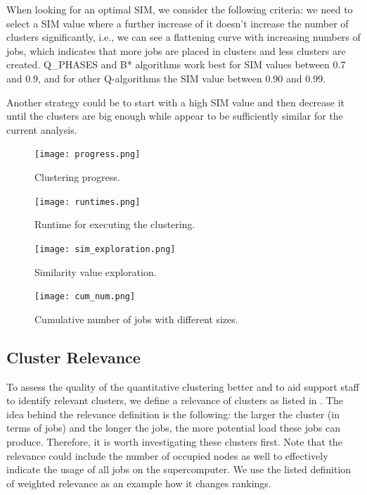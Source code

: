\documentclass{jhps}
\begin{document}
When looking for an optimal SIM, we consider the following criteria:
we need to select a SIM value where a further increase of it doesn't increase the number of clusters significantly, i.e., we can see a flattening curve with increasing numbers of jobs, which indicates that more jobs are placed in clusters and less clusters are created.
Q\_PHASES and B* algorithms work best for SIM values between 0.7 and 0.9, and for other Q-algorithms the SIM value between 0.90 and 0.99.

Another strategy could be to start with a high SIM value and then decrease it until the clusters are big enough while appear to be sufficiently similar for the current analysis.

\begin{figure}
  \centering
   \texttt{[image: progress.png]}
   \caption{Clustering progress.}
   \label{fig:clustering_progress}
\end{figure}

\begin{figure}
  \centering
  \texttt{[image: runtimes.png]}
  \caption{Runtime for executing the clustering.}
  \label{fig:alg_runtimes}
\end{figure}


\begin{figure}
  \centering
  \texttt{[image: sim\_exploration.png]}
  \caption{Similarity value exploration.}
  \label{fig:sim_exploration}
\end{figure}

\begin{figure}
  \centering
  \texttt{[image: cum\_num.png]}
  \caption{Cumulative number of jobs with different sizes.}
  \label{fig:cum_num_job_sizes}
\end{figure}

\subsection{Cluster Relevance}

To assess the quality of the quantitative clustering better and to aid support staff to identify relevant clusters, we define a relevance of clusters as listed in .
The idea behind the relevance definition is the following: the larger the cluster (in terms of jobs) and the longer the jobs, the more potential load these jobs can produce.
Therefore, it is worth investigating these clusters first.
Note that the relevance could include the number of occupied nodes as well to effectively indicate the usage of all jobs on the supercomputer.
We use the listed definition of weighted relevance as an example how it changes rankings.
\end{document}
